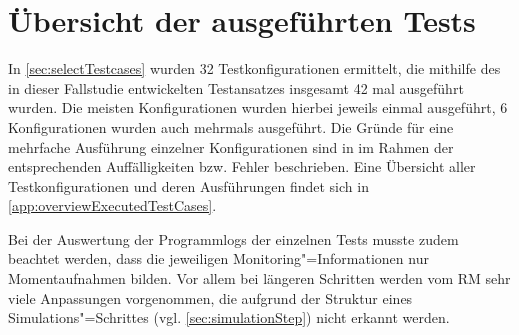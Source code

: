 \section{Übersicht der ausgeführten Tests}
\label{sec:overviewExecTestCases}

In \autoref{sec:selectTestcases} wurden 32 Testkonfigurationen ermittelt, die mithilfe des in dieser Fallstudie entwickelten Testansatzes insgesamt 42 mal ausgeführt wurden.
Die meisten Konfigurationen wurden hierbei jeweils einmal ausgeführt, 6 Konfigurationen wurden auch mehrmals ausgeführt.
Die Gründe für eine mehrfache Ausführung einzelner Konfigurationen sind in im Rahmen der entsprechenden Auffälligkeiten bzw. Fehler beschrieben.
Eine Übersicht aller Testkonfigurationen und deren Ausführungen findet sich in \autoref{app:overviewExecutedTestCases}.

Bei der Auswertung der Programmlogs der einzelnen Tests musste zudem beachtet werden, dass die jeweiligen Monitoring"=Informationen nur Momentaufnahmen bilden.
Vor allem bei längeren Schritten werden vom \ac{RM} sehr viele Anpassungen vorgenommen, die aufgrund der Struktur eines Simulations"=Schrittes (vgl. \autoref{sec:simulationStep}) nicht erkannt werden.
